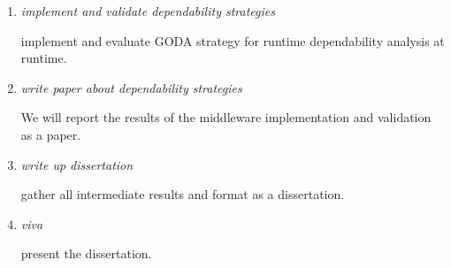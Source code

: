 \begin{enumerate}

\item \emph{implement and validate dependability strategies}

 implement and evaluate GODA\cite{mendonca_dependability_2015} strategy for runtime dependability analysis at runtime.

 \item \emph{write paper about dependability strategies}

 We will report the results of the middleware implementation and validation as a paper.

\item \emph{write up dissertation}

gather all intermediate results and format as a dissertation.

\item \emph{viva}

present the dissertation.

\end{enumerate}
